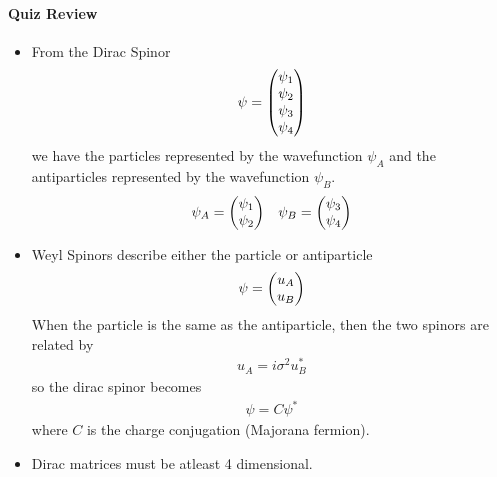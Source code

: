 \documentclass[../main.tex]{subfiles}
\begin{document}
\paragraph*{Quiz Review}
\begin{itemize}
    \item From the Dirac Spinor
    \begin{align*}
        \psi = \mqty(\psi_1 \\ \psi_2 \\ \psi_3 \\ \psi_4)
    \end{align*}
    we have the particles represented by the wavefunction $\psi_A$ and the antiparticles represented by
    the wavefunction $\psi_B$.
    \begin{align*}
        \psi_A = \mqty(\psi_1 \\ \psi_2) \quad \psi_B = \mqty(\psi_3 \\ \psi_4)
    \end{align*}
    \item Weyl Spinors describe either the particle or antiparticle
    \begin{align*}
        \psi = \mqty(u_A \\ u_B)
    \end{align*}
    When the particle is the same as the antiparticle, then the two spinors are related by 
    \begin{align*}
        u_A = i\sigma^2 u_B^*
    \end{align*}
    so the dirac spinor becomes
    \begin{align*}
        \psi = C \psi^*
    \end{align*}
    where $C$ is the charge conjugation (Majorana fermion).
    \item Dirac matrices must be atleast 4 dimensional. 
\end{itemize}
\end{document}
